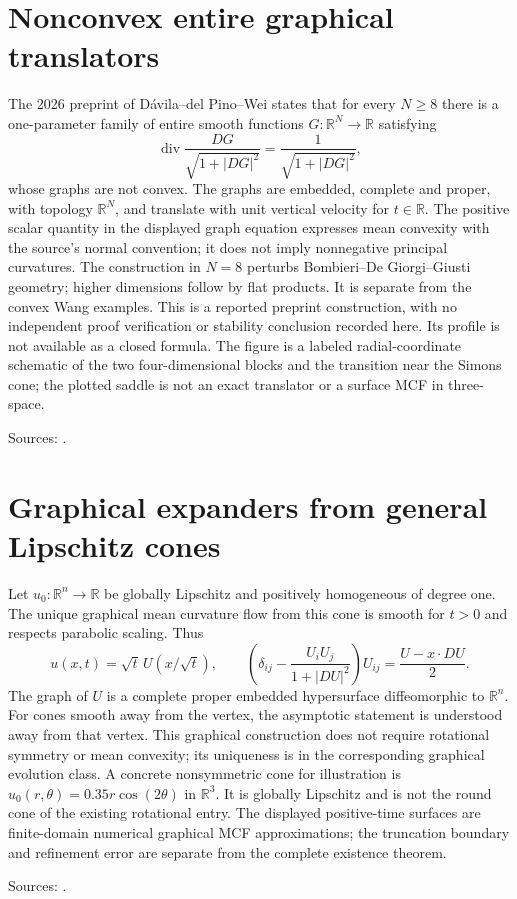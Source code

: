 \chapter{Nonconvex entire graphical translators}\label{sec:catalogue-nonconvex-entire-translators}
\begin{example}\label{ex:catalogue-nonconvex-entire-translators}
The 2026 preprint of D\'avila--del Pino--Wei states that for every $N\ge8$ there is a one-parameter family of entire smooth functions $G:\mathbb R^N\to\mathbb R$ satisfying
\[
 \operatorname{div}\frac{DG}{\sqrt{1+|DG|^2}}=\frac1{\sqrt{1+|DG|^2}},
\]
whose graphs are not convex. The graphs are embedded, complete and proper, with topology $\mathbb R^N$, and translate with unit vertical velocity for $t\in\mathbb R$. The positive scalar quantity in the displayed graph equation expresses mean convexity with the source's normal convention; it does not imply nonnegative principal curvatures. The construction in $N=8$ perturbs Bombieri--De Giorgi--Giusti geometry; higher dimensions follow by flat products. It is separate from the convex Wang examples.
This is a reported preprint construction, with no independent proof verification or stability conclusion recorded here. Its profile is not available as a closed formula. The figure is a labeled radial-coordinate schematic of the two four-dimensional blocks and the transition near the Simons cone; the plotted saddle is not an exact translator or a surface MCF in three-space.
\par Sources: \cite{CatDavilaPinoWei2026}.
\end{example}

\chapter{Graphical expanders from general Lipschitz cones}\label{sec:catalogue-graphical-cone-expanders}
\begin{example}\label{ex:catalogue-graphical-cone-expanders}
Let $u_0:\mathbb R^n\to\mathbb R$ be globally Lipschitz and positively homogeneous of degree one. The unique graphical mean curvature flow from this cone is smooth for $t>0$ and respects parabolic scaling. Thus
\[
 u(x,t)=\sqrt t\,U(x/\sqrt t),\qquad
 \left(\delta_{ij}-\frac{U_iU_j}{1+|DU|^2}\right)U_{ij}
       =\frac{U-x\cdot DU}{2}.
\]
The graph of $U$ is a complete proper embedded hypersurface diffeomorphic to $\mathbb R^n$. For cones smooth away from the vertex, the asymptotic statement is understood away from that vertex. This graphical construction does not require rotational symmetry or mean convexity; its uniqueness is in the corresponding graphical evolution class. A concrete nonsymmetric cone for illustration is $u_0(r,\theta)=0.35r\cos(2\theta)$ in $\mathbb R^3$. It is globally Lipschitz and is not the round cone of the existing rotational entry. The displayed positive-time surfaces are finite-domain numerical graphical MCF approximations; the truncation boundary and refinement error are separate from the complete existence theorem.
\par Sources: \cite{CatEckerHuisken1989}.
\end{example}

